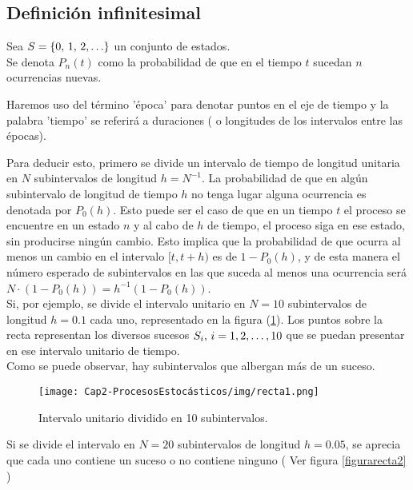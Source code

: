 \subsection{Definición infinitesimal}
    Sea $S=\{0,\thinspace 1,\thinspace 2,\ldots\}$ un conjunto de estados.\\Se denota $P_n(t)$ como la probabilidad de que en el tiempo $t$ sucedan $n$ ocurrencias nuevas.\\
    \begin{Obs}
    Haremos uso del término 'época' para denotar puntos en el eje de tiempo y la palabra 'tiempo' se referirá a duraciones ( o longitudes de los intervalos entre las épocas).
    \end{Obs}
    Para deducir esto, primero se divide un intervalo de tiempo de longitud unitaria en $N$ subintervalos de longitud $h=N^{-1}$.
    La probabilidad de que en algún subintervalo de longitud de tiempo $h$ no tenga lugar alguna ocurrencia es denotada por $P_0(h)$. 
    Esto puede ser el caso de que en un tiempo $t$ el proceso se encuentre en un estado $n$ y al cabo de $h$ de tiempo, el proceso siga en ese estado, sin producirse ningún cambio. Esto implica que la probabilidad de que ocurra al menos un cambio en el intervalo $[t,t+h)$ es de  $1-P_0(h)$, y de esta manera el número esperado de subintervalos en las que suceda al menos una ocurrencia será $N\cdot(1-P_0(h))=h^{-1}(1-P_0(h))$.
    \\Si, por ejemplo, se divide el intervalo unitario en $N=10$ subintervalos de longitud $h=0.1$ cada uno, representado en la figura (\ref{fig-procesoPoison-recta1}). Los puntos sobre la recta representan los diversos sucesos $S_i,\thinspace i=1,2,\ldots,10$ que se puedan presentar en ese intervalo unitario de tiempo.\\ Como se puede observar, hay subintervalos que albergan más de un suceso.
    \begin{center}
        \begin{figure}[htb]
            \texttt{[image: Cap2-ProcesosEstocásticos/img/recta1.png]}
            \caption{Intervalo unitario dividido en 10 subintervalos.}
            \label{fig-procesoPoison-recta1}
            \vspace*{0.05in}
        \end{figure}
    \end{center}
    Si se divide el intervalo en $N=20$ subintervalos de longitud $h=0.05$, se aprecia que cada uno contiene un suceso o no contiene ninguno ( Ver figura \ref{figurarecta2} )\\  

